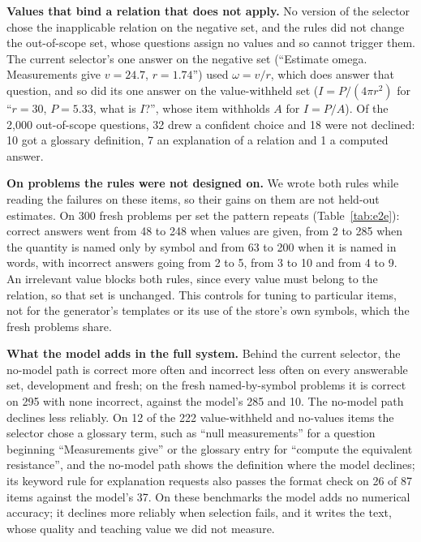 \documentclass[10pt]{article}
\begin{document}
\textbf{Values that bind a relation that does not apply.} No version of the selector chose the inapplicable
relation on the negative set, and the rules did not change the out-of-scope set, whose questions assign no
values and so cannot trigger them. The current selector's one answer on the negative set (``Estimate omega.
Measurements give $v = 24.7$, $r = 1.74$'') used $\omega = v/r$, which does answer that question, and so
did its one answer on the value-withheld set ($I = P/(4\pi r^2)$ for ``$r = 30$, $P = 5.33$, what is $I$?'',
whose item withholds $A$ for $I = P/A$). Of the 2,000 out-of-scope questions, 32 drew a confident choice
and 18 were not declined: 10 got a glossary definition, 7 an explanation of a relation and 1 a computed
answer.

\textbf{On problems the rules were not designed on.} We wrote both rules while reading the failures on
these items, so their gains on them are not held-out estimates. On 300 fresh problems per set the pattern
repeats (Table~\ref{tab:e2e}): correct answers went from 48 to 248 when values are given, from 2 to 285
when the quantity is named only by symbol and from 63 to 200 when it is named in words, with incorrect
answers going from 2 to 5, from 3 to 10 and from 4 to 9. An irrelevant value blocks both rules, since
every value must belong to the relation, so that set is unchanged. This controls for tuning to particular
items, not for the generator's templates or its use of the store's own symbols, which the fresh problems
share.

\textbf{What the model adds in the full system.} Behind the current selector, the no-model path is correct
more often and incorrect less often on every answerable set, development and fresh; on the fresh
named-by-symbol problems it is correct on 295 with none incorrect, against the model's 285 and 10. The
no-model path declines less reliably. On 12 of the 222 value-withheld and no-values items the selector
chose a glossary term, such as ``null measurements'' for a question beginning ``Measurements give'' or
the glossary entry for ``compute the equivalent resistance'', and the no-model path shows the definition
where the model declines; its keyword rule for explanation requests also passes the format check on 26 of
87 items against the model's 37. On these benchmarks the model adds no numerical accuracy; it declines
more reliably when selection fails, and it writes the text, whose quality and teaching value we did
not measure.

\end{document}
